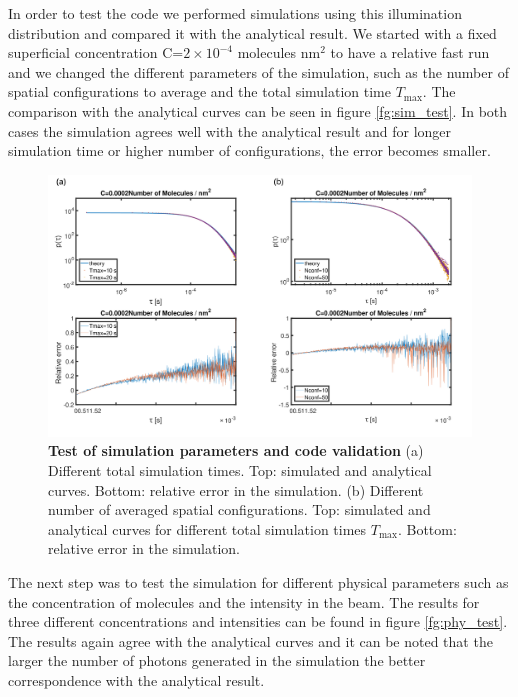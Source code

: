 

In order to test the code we performed simulations using this illumination distribution and compared it with the analytical result. We started with a fixed superficial concentration  C=$2 \times 10^{-4}$ molecules nm$^2$ to have a relative fast run and we changed the different parameters of the simulation, such as the number of spatial configurations to average and the total simulation time $T_{\mbox{max}}$. The comparison with the analytical curves can be seen in figure \ref{fg:sim_test}. In both cases the simulation agrees well with the analytical result and for longer simulation time or higher number of configurations, the error becomes smaller.


 \begin{figure}
 \centering
 \includegraphics[width=\textwidth]{Theta_results}%
 \caption{\textbf{Test of simulation parameters and code validation} 
(a) Different total simulation times. Top: simulated and analytical curves. Bottom: relative error in the simulation.
(b) Different number of averaged spatial configurations. Top: simulated and analytical curves for different total simulation times $T_{\mbox{max}}$. Bottom: relative error in the simulation.
\label{fg:Theta_results}}
 \end{figure}


The next step was to test the simulation for different physical parameters such as the concentration of molecules and the intensity in the beam. The results for three different concentrations and intensities can be found in figure \ref{fg:phy_test}. The results again agree with the analytical curves and it can be noted that the larger the number of photons generated in the simulation the better correspondence with the analytical result.


